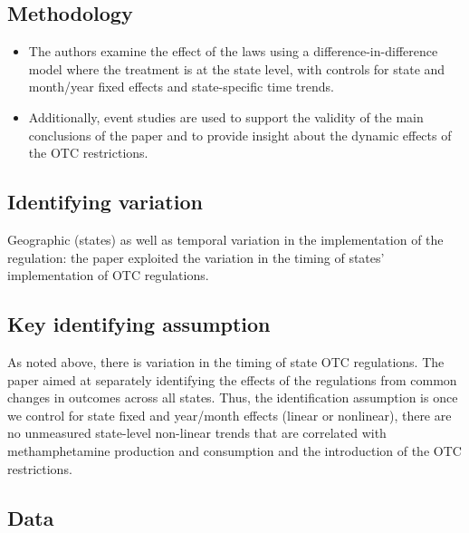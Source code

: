 \documentclass[
  11pt,
]{article}
\providecommand{\tightlist}{%
  \setlength{\itemsep}{0pt}\setlength{\parskip}{0pt}}
\begin{document}
\hypertarget{methodology}{%
\subsection*{Methodology}\label{methodology}}

\begin{itemize}
\tightlist
\item
  The authors examine the effect of the laws using a
  difference-in-difference model where the treatment is at the state
  level, with controls for state and month/year fixed effects and
  state-specific time trends.
\item
  Additionally, event studies are used to support the validity of the
  main conclusions of the paper and to provide insight about the dynamic
  effects of the OTC restrictions.
\end{itemize}

\hypertarget{identifying-variation}{%
\subsection*{Identifying variation}\label{identifying-variation}}

Geographic (states) as well as temporal variation in the implementation
of the regulation: the paper exploited the variation in the timing of
states' implementation of OTC regulations.

\hypertarget{key-identifying-assumption}{%
\subsection*{Key identifying
assumption}\label{key-identifying-assumption}}

As noted above, there is variation in the timing of state OTC
regulations. The paper aimed at separately identifying the effects of
the regulations from common changes in outcomes across all states. Thus,
the identification assumption is once we control for state fixed and
year/month effects (linear or nonlinear), there are no unmeasured
state-level non-linear trends that are correlated with methamphetamine
production and consumption and the introduction of the OTC restrictions.

\hypertarget{data}{%
\subsection*{Data}\label{data}}
\end{document}
